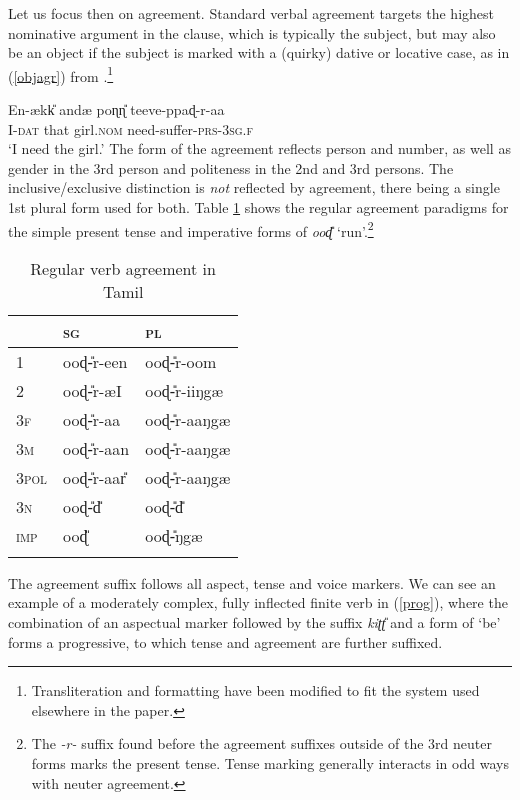 \documentclass[output=paper, modfonts, nonflat]{langsci/langscibook}
\begin{document}
Let us focus then on agreement. Standard verbal agreement targets the
highest nominative argument in the clause, which is typically the
subject, but may also be an object if the subject is marked with a
(quirky) dative or locative case, as in (\ref{objagr}) from
\citet{baker:casepp}.\footnote{Transliteration and formatting have
  been modified to fit the system used elsewhere in the
  paper.}

\ea\label{objagr}\gll En-ækk\U{} andæ{} poɳɳ\U{} teeve-ppaɖ-r-aa\\ 
I-\textsc{dat}{} that girl.\textsc{nom}{} need-suffer-\textsc{prs}-3\textsc{sg.f}\\ 
\glt `I need the girl.'
\z
%
The form of the agreement reflects person and number, as well as
gender in the 3rd person and politeness in the 2nd and 3rd
persons. The inclusive/exclusive distinction is \emph{not} reflected
by agreement, there being a single 1st plural form used for
both. Table \ref{tab:agrforms} shows the regular agreement paradigms
for the simple present tense and imperative forms of \textit{ooɖ\U}
`run'.\footnote{The \textit{-r-} suffix found before the agreement
  suffixes outside of the 3rd neuter forms marks the present
  tense. Tense marking generally interacts in odd ways with neuter
  agreement.}
\begin{table}[!h]
  \caption{Regular verb agreement in Tamil}
  \label{tab:agrforms}
  \begin{tabularx}{\textwidth}{XXX} 
    \lsptoprule
    & \textsc{sg} & \textsc{pl}\\ 
    \midrule
    1 & ooɖ\U-r-een & ooɖ\U-r-oom \\
    2 & ooɖ\U-r-æI & ooɖ\U-r-iiŋgæ\\
    3\textsc{f} & ooɖ\U-r-aa & ooɖ\U-r-aaŋgæ\\
    3\textsc{m}& ooɖ\U-r-aan & ooɖ\U-r-aaŋgæ\\
    3\textsc{pol}& ooɖ\U-r-aar\U & ooɖ\U-r-aaŋgæ\\
    3\textsc{n} & ooɖ\U-d\U & ooɖ\U-d\U \\
    \textsc{imp} & ooɖ\U & ooɖ\U-ŋgæ\\
    \lspbottomrule
  \end{tabularx}
\end{table}
The agreement suffix follows all aspect, tense and voice markers.
We can see an example of a moderately complex, fully inflected finite
verb in (\ref{prog}), where the combination of an aspectual marker
followed by the suffix \textit{kiʈʈ\U} and a form of `be' forms a
progressive, to which tense and agreement are further suffixed.
\end{document}
